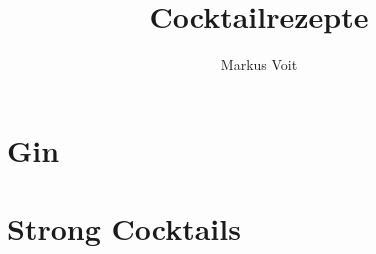 \documentclass[
  DIV=11,%
  pagesize,%
  fontsize=11pt,%
  paper=a4,%
  numbers=noenddot,
]{scrartcl}
\title{Cocktailrezepte}
\author{Markus Voit}
\begin{document}
\maketitle

\tableofcontents
\clearpage

\section{Gin}
\newpage{}
\newpage{}

\section{Strong Cocktails}
\newpage{}
\newpage{}
\newpage{}
\end{document}
